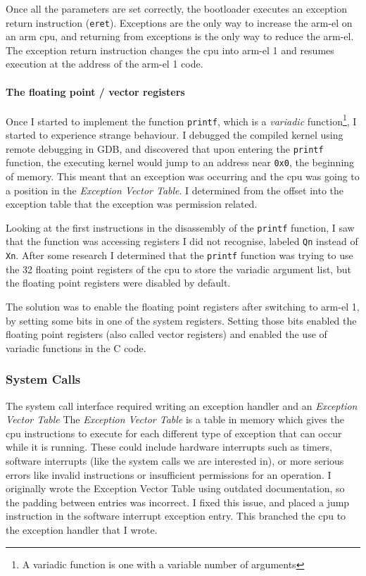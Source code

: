 \documentclass{article}
\begin{document}
Once all the parameters are set correctly, the bootloader executes an exception
return instruction (\verb!eret!). Exceptions are the only way to increase the
\gls{arm-el} on an \gls{arm} \gls{cpu}, and returning from exceptions is the
only way to reduce the \gls{arm-el}. The exception return instruction changes
the \gls{cpu} into \gls{arm-el} 1 and resumes execution at the address of the
\gls{arm-el} 1 code.

\paragraph{The floating point / vector registers}
Once I started to implement the function \verb!printf!, which is a
\emph{variadic} function\footnote{A variadic function is one with a variable
number of arguments}, I started to experience strange behaviour. I debugged the
compiled kernel using remote debugging in GDB, and discovered that upon
entering the \verb!printf! function, the executing kernel would jump to an
address near \texttt{0x0}, the beginning of memory. This meant that an
exception was occurring and the \gls{cpu} was going to a position in the
\emph{Exception Vector Table}. I determined from the offset into the exception
table that the exception was permission related.

Looking at the first instructions in the disassembly of the \verb!printf!
function, I saw that the function was accessing registers I did not recognise,
labeled \texttt{Qn} instead of \texttt{Xn}. After some research I determined
that the \verb!printf! function was trying to use the 32 floating point
registers of the \gls{cpu} to store the variadic argument list, but the
floating point registers were disabled by default.

The solution was to enable the floating point registers after switching to
\gls{arm-el} 1, by setting some bits in one of the system registers. Setting
those bits enabled the floating point registers (also called vector registers)
and enabled the use of variadic functions in the C code.

\subsubsection{System Calls}
\label{sec:impl_syscalls}
The system call interface required writing an exception handler and an
\emph{Exception Vector Table} The \emph{Exception Vector Table} is a
table in memory which gives the \gls{cpu} instructions to execute for each
different type of exception that can occur while it is running. These could
include hardware interrupts such as timers, software interrupts (like the
system calls we are interested in), or more serious errors like invalid
instructions or insufficient permissions for an operation. I originally wrote
the Exception Vector Table using outdated documentation, so the padding between
entries was incorrect. I fixed this issue, and placed a jump instruction in the
software interrupt exception entry. This branched the \gls{cpu} to the
exception handler that I wrote.
\end{document}

